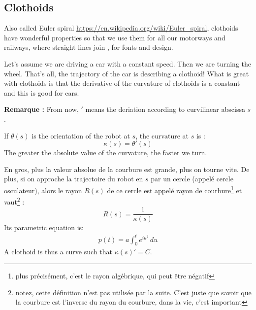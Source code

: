 \documentclass[11pt]{article}
\begin{document}
    \subsection{Clothoids}\label{subsec:clothoids}
    Also called Euler spiral \href{https://en.wikipedia.org/wiki/Euler\_spiral}{https://en.wikipedia.org/wiki/Euler\_spiral}, clothoids have wonderful properties so that we use them for all our motorways and railways, where straight lines join \cite{baass1982use}, for fonts and design.
    
    Let's assume we are driving a car with a constant speed. Then we are turning the wheel. That's all, the trajectory of the car is describing a clothoid! What is great with clothoids is that the derivative of the curvature of clothoids is a constant and this is good for cars.
    

    \textbf{Remarque :} From now, $'$ means the deriation according to curvilinear abscissa $s$.

    If $\theta(s)$ is the orientation of the robot at $s$, the curvature at $s$ is :
    \[\kappa(s) = \theta'(s)\]
    The greater the absolute value of the curvature, the faster we turn.
    
    En gros, plus la valeur absolue de la courbure est grande, plus on tourne vite. De plus, si on approche la trajectoire du robot en $s$ par un cercle (appelé cercle osculateur), alors le rayon $R(s)$ de ce cercle est appelé rayon de courbure\footnote{plus précisément, c'est le rayon algébrique, qui peut être négatif} et vaut\footnote{notez, cette définition n'est pas utilisée par la suite. C'est juste que savoir que la courbure est l'inverse du rayon du courbure, dans la vie, c'est important} :
    \[R(s) = \frac{1}{\kappa(s)}\]
    Its parametric equation is:
    \begin{align*}
        \tag{*}
        p(t) = a \int_0^t e^{i u^2} \, du
        \label{equ:clotho_param}
    \end{align*}
    A clothoid is thus a curve such that $\kappa(s)' = C$.
\end{document}
